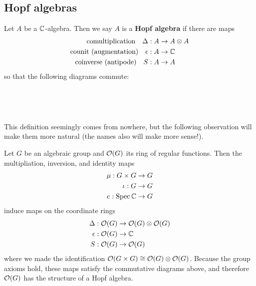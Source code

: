 \documentclass[12pt]{article}
\begin{document}
\subsection{Hopf algebras}
\begin{definition}\label{def:hopf}
    Let $A$ be a $\mathbb{C}$-algebra. Then we say $A$ is a \textbf{Hopf algebra} if there are maps \begin{align*}
        \text{comultiplication\quad}\Delta: A &\to A\otimes A \\
        \text{counit (augmentation)\quad}\epsilon: A &\to \mathbb{C} \\
        \text{coinverse (antipode)\quad}S: A &\to A
    \end{align*}
    so that the following diagrams commute:
    \begin{center}
         \\

         \\
        

    \end{center}
\end{definition}
This definition seemingly comes from nowhere, but the following observation will make them more natural
(the names also will make more sense!).

\hfill

Let $G$ be an algebraic group and $\mathcal{O}(G)$ its ring of regular functions. Then the multipliation,
inversion, and identity maps \begin{align*}
    \mu: G\times G &\to G \\
    \iota: G &\to G \\
    e: \operatorname{Spec} \mathbb{C} &\to G
\end{align*}
induce maps on the coordinate rings
\begin{align*}
    \Delta: \mathcal{O}(G) &\to \mathcal{O}(G)\otimes \mathcal{O}(G) \\
    \epsilon: \mathcal{O}(G) &\to \mathbb{C} \\
    S: \mathcal{O}(G) &\to \mathcal{O}(G)
\end{align*} where we made the identification $\mathcal{O}(G\times G) \cong \mathcal{O}(G)\otimes \mathcal{O}(G)$.
Because the group axioms hold, these maps satisfy the commutative diagrams above, and therefore
$\mathcal{O}(G)$ has the structure of a Hopf algebra.
\end{document}
